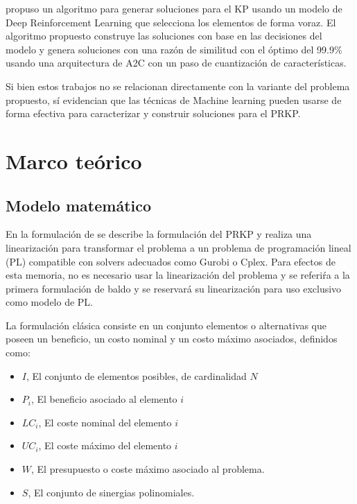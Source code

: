 \documentclass[spanish, a4paper, 12pt, twoside, openany,final]{book}
\numberwithin{equation}{section}
\begin{document}
\cite{afshar_state_2020} propuso un algoritmo para generar soluciones para el KP usando un modelo de Deep Reinforcement Learning que selecciona los elementos de forma voraz. El algoritmo propuesto construye las soluciones con base en las decisiones del modelo y genera soluciones con una razón de similitud con el óptimo del 99.9\% usando una arquitectura de A2C con un paso de cuantización de características.

Si bien estos trabajos no se relacionan directamente con la variante del problema propuesto, sí evidencian que las técnicas de Machine learning pueden usarse de forma efectiva para caracterizar y construir soluciones para el PRKP.


\clearpage

\chapter{Marco teórico}
    \section{Modelo matemático}
    
    En la formulación de \cite{baldo_polynomial_2023} se describe la formulación del PRKP y realiza una linearización para transformar el problema a un problema de programación lineal (PL) compatible con solvers adecuados como Gurobi o Cplex. Para efectos de esta memoria, no es necesario usar la linearización del problema y se referiŕa a la primera formulación de baldo y se reservará su linearización para uso exclusivo como modelo de PL.
    
    La formulación clásica consiste en un conjunto elementos o alternativas que poseen un beneficio, un costo nominal y un costo máximo asociados, definidos como:
    
    \begin{itemize}
    	\item $I$, El conjunto de elementos posibles, de cardinalidad $N$
    	\item $P_i$, El beneficio asociado al elemento $i$ %
    	\item $LC_i$, El coste nominal del elemento $i$    %
    	\item $UC_i$, El coste máximo del elemento $i$     %
    	\item $W$, El presupuesto o coste máximo asociado al problema.
    	\item $S$, El conjunto de sinergias polinomiales.
    \end{itemize}
    
\end{document}
